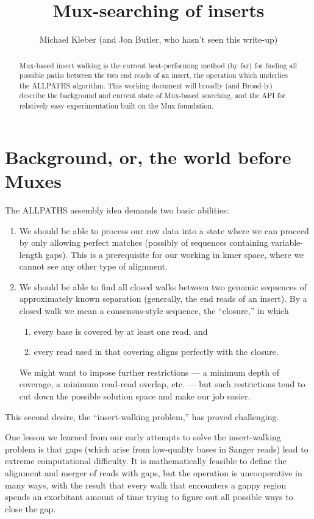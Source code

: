 \documentclass[11pt]{article}
\title{Mux-searching of inserts}
\author{Michael Kleber (and Jon Butler, who hasn't seen this write-up)}
\begin{document}
\maketitle

\begin{abstract}
Mux-based insert walking is the current best-performing method (by far)
for finding all possible paths between the two end reads of an insert,
the operation which underlies the ALLPATHS algorithm.  This working
document will broadly (and Broad-ly) describe the background and current 
state of Mux-based searching, and the API for relatively easy experimentation 
built on the Mux foundation.
\end{abstract}

\section{Background, or, the world before Muxes}
\label{sec_background}

The ALLPATHS assembly idea demands two basic abilities:

\begin{enumerate}
\item
We should be able to process our raw data into a state where we can proceed by 
only allowing perfect matches (possibly of sequences containing variable-length gaps).  
This is a prerequisite for our working in kmer space, where we cannot see any other
type of alignment.
\item
We should be able to find all closed walks between two genomic sequences of 
approximately known separation (generally, the end reads of an insert).  By a 
closed walk we mean a consensus-style sequence, the ``closure,'' in which 
\begin{enumerate}
\item every base is covered by at least one read, and 
\item every read used in that covering aligns perfectly with the closure.
\end{enumerate}
We might want to impose further restrictions --- a minimum depth 
of coverage, a minimum read-read overlap, etc. --- but such restrictions 
tend to cut down the possible solution space and make our job easier.
\end{enumerate}
This second desire, the ``insert-walking problem,'' has proved challenging.

One lesson we learned from our early attempts to solve the insert-walking 
problem is that gaps (which arise from low-quality bases in Sanger reads) lead to 
extreme computational difficulty.  It is mathematically feasible to define the 
alignment and merger of reads with gaps, but the operation is uncooperative in 
many ways, with the result that every walk that encounters a gappy region spends 
an exorbitant amount of time trying to figure out all possible ways to close the gap.
\end{document}
